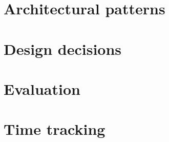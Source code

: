 \documentclass[11pt, oneside]{book}
\begin{document}
\chapter{Architectural patterns}
\label{chp:patterns}


\chapter{Design decisions}
\label{chp:design_decisions}


\chapter{Evaluation}
\label{chp:evaluation}


%

\listoftodos[Notes]

\appendix

\chapter{Time tracking}
\label{chp:time_track}


\backmatter

\printbibliography
\end{document}
